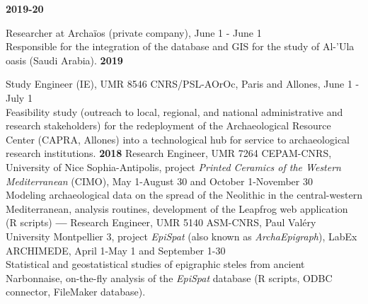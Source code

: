 \documentclass{article}
\newcommand{\fr}[1]{}       %
\newcommand{\en}[1]{#1}     %
\begin{document}
\smallbreak
\textbf{2019-20} 
\fr{Chercheur Archaïos (compagnie privée), 1er juin - 1er juin \\
\hspace*{0.5cm} Chargé de l'intégration de la base de données et du SIG pour l'étude de l'oasis d'Al-'Ula (Arabie Saoudite).}
\en{Researcher at Archaïos (private company), June 1 - June 1 \\
\hspace*{0.5cm} Responsible for the integration of the database and GIS for the study of Al-'Ula oasis (Saudi Arabia).}
\smallbreak
\textbf{2019} 
\fr{Ingénieur d'études (IE), UMR 8546 CNRS/PSL-AOrOc, Paris et Allones, 1er juin - 1er juillet \\ 
\hspace*{0.5cm} Étude de faisabilité (prospection auprès des acteurs administratifs et de recherche, locaux, régionaux et nationaux) pour le redéploiement du Centre de Ressources Archéologique (CAPRA, Allones) en \textit{hub} technologique pour le service aux institutions de recherche en archéologie.}
\en{Study Engineer (IE), UMR 8546 CNRS/PSL-AOrOc, Paris and Allones, June 1 - July 1 \\ 
\hspace*{0.5cm} Feasibility study (outreach to local, regional, and national administrative and research stakeholders) for the redeployment of the Archaeological Resource Center (CAPRA, Allones) into a technological hub for service to archaeological research institutions.}
\smallbreak
\textbf{2018} \fr{Ingénieur de recherche (IR), UMR 7264 CEPAM-CNRS, Université Nice Sophia-Antipolis, projet \textit{Céramiques Imprimées de Méditerranée occidentale} (CIMO), 1er mai-30 août et 1er octobre-30 novembre} \en{Research Engineer, UMR 7264 CEPAM-CNRS, University of Nice Sophia-Antipolis, project \textit{Printed Ceramics of the Western Mediterranean} (CIMO), May 1-August 30 and October 1-November 30} \\
\hspace*{0.5cm} \fr{Modélisation des données archéologiques de la diffusion du Néolithique en Méditerranée centro-occidentale, routines d'analyses, développement de l'application web Leapfrog (scripts R)} \en{Modeling archaeological data on the spread of the Neolithic in the central-western Mediterranean, analysis routines, development of the Leapfrog web application (R scripts)}
\smallbreak
\textbf{--- } \fr{Ingénieur de recherche (IR), UMR 5140 ASM-CNRS, Université Paul Valéry Montpellier 3, projet \textit{EpiSpat} (aka \textit{ArchaEpigraph}), LabEx ARCHIMEDE, 1er avril-1er mai et 1er-30 septembre} \en{Research Engineer, UMR 5140 ASM-CNRS, Paul Valéry University Montpellier 3, project \textit{EpiSpat} (also known as \textit{ArchaEpigraph}), LabEx ARCHIMEDE, April 1-May 1 and September 1-30} \\
\hspace*{0.5cm} \fr{Étude statistiques et géostatistiques des stèles épigraphiques de la Narbonnaise antique, analyses à la volée de la base de données \textit{EpiSpat}(scripts R, connecteur ODBC, base de données FileMaker).} \en{Statistical and geostatistical studies of epigraphic steles from ancient Narbonnaise, on-the-fly analysis of the \textit{EpiSpat} database (R scripts, ODBC connector, FileMaker database).}
\end{document}

